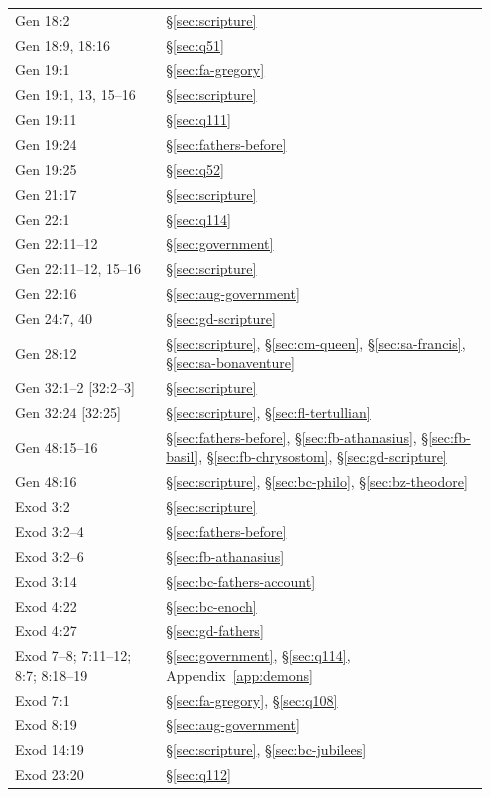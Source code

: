 \begin{longtable}{>{\raggedright\arraybackslash}p{0.30\linewidth}>{\raggedright\arraybackslash}p{0.64\linewidth}}
Gen 18:2 & \S\ref{sec:scripture}\\
Gen 18:9, 18:16 & \S\ref{sec:q51}\\
Gen 19:1 & \S\ref{sec:fa-gregory}\\
Gen 19:1, 13, 15--16 & \S\ref{sec:scripture}\\
Gen 19:11 & \S\ref{sec:q111}\\
Gen 19:24 & \S\ref{sec:fathers-before}\\
Gen 19:25 & \S\ref{sec:q52}\\
Gen 21:17 & \S\ref{sec:scripture}\\
Gen 22:1 & \S\ref{sec:q114}\\
Gen 22:11--12 & \S\ref{sec:government}\\
Gen 22:11--12, 15--16 & \S\ref{sec:scripture}\\
Gen 22:16 & \S\ref{sec:aug-government}\\
Gen 24:7, 40 & \S\ref{sec:gd-scripture}\\
Gen 28:12 & \S\ref{sec:scripture}, \S\ref{sec:cm-queen}, \S\ref{sec:sa-francis}, \S\ref{sec:sa-bonaventure}\\
Gen 32:1--2 [32:2--3] & \S\ref{sec:scripture}\\
Gen 32:24 [32:25] & \S\ref{sec:scripture}, \S\ref{sec:fl-tertullian}\\
Gen 48:15--16 & \S\ref{sec:fathers-before}, \S\ref{sec:fb-athanasius}, \S\ref{sec:fb-basil}, \S\ref{sec:fb-chrysostom}, \S\ref{sec:gd-scripture}\\
Gen 48:16 & \S\ref{sec:scripture}, \S\ref{sec:bc-philo}, \S\ref{sec:bz-theodore}\\
Exod 3:2 & \S\ref{sec:scripture}\\
Exod 3:2--4 & \S\ref{sec:fathers-before}\\
Exod 3:2--6 & \S\ref{sec:fb-athanasius}\\
Exod 3:14 & \S\ref{sec:bc-fathers-account}\\
Exod 4:22 & \S\ref{sec:bc-enoch}\\
Exod 4:27 & \S\ref{sec:gd-fathers}\\
Exod 7--8; 7:11--12; 8:7; 8:18--19 & \S\ref{sec:government}, \S\ref{sec:q114}, Appendix~\ref{app:demons}\\
Exod 7:1 & \S\ref{sec:fa-gregory}, \S\ref{sec:q108}\\
Exod 8:19 & \S\ref{sec:aug-government}\\
Exod 14:19 & \S\ref{sec:scripture}, \S\ref{sec:bc-jubilees}\\
Exod 23:20 & \S\ref{sec:q112}\\

\end{longtable}
